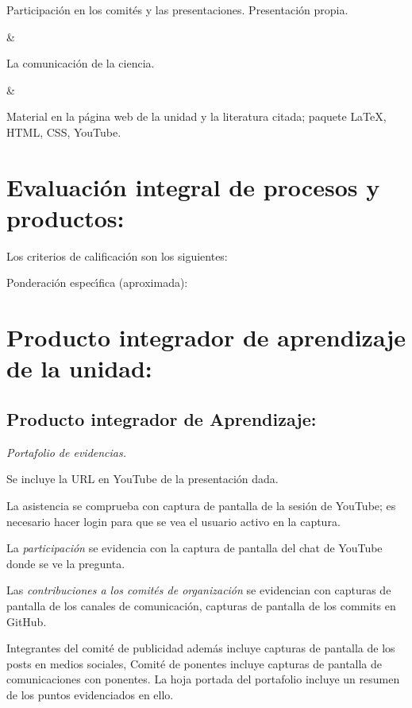 Participaci\'{o}n en los comit\'{e}s y las
presentaciones. Presentaci\'{o}n propia.

&

La comunicaci\'{o}n de la ciencia.

&

Material en la p\'{a}gina web de la unidad y la literatura citada;
paquete {\LaTeX}, HTML, CSS, YouTube.



\section{Evaluaci\'{o}n integral de procesos y productos:}

Los criterios de calificaci\'{o}n son los siguientes:

  
Ponderaci\'{o}n espec\'{\i}fica (aproximada):

 

\newpage

\section{Producto integrador de aprendizaje de la unidad:}

\subsection{Producto integrador de Aprendizaje:}

{\em Portafolio de evidencias.}

Se incluye la URL en YouTube de la presentaci\'{o}n dada.

La asistencia se comprueba con captura de pantalla de la sesi\'{o}n de
YouTube; es necesario hacer login para que se vea el usuario activo en
la captura.

La {\em participaci\'{o}n} se evidencia con la captura de pantalla del
chat de YouTube donde se ve la pregunta.

Las {\em contribuciones a los comit\'{e}s de organizaci\'{o}n} se
evidencian con capturas de pantalla de los canales de
comunicaci\'{o}n, capturas de pantalla de los commits en
GitHub.

Integrantes del comit\'{e} de publicidad adem\'{a}s incluye capturas
de pantalla de los posts en medios sociales, Comit\'{e} de ponentes
incluye capturas de pantalla de comunicaciones con ponentes. La hoja
portada del portafolio incluye un resumen de los puntos evidenciados
en ello.
